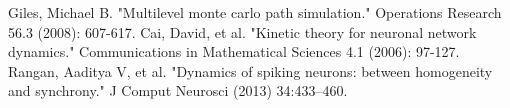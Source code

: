\documentclass[10pt]{article}
\begin{document}
\begin{multicols}{2}
\begin{thebibliography}{3}                                          
   Giles, Michael B. "Multilevel monte carlo path simulation." Operations Research 56.3 (2008): 607-617.
   Cai, David, et al. "Kinetic theory for neuronal network dynamics." Communications in Mathematical Sciences 4.1 (2006): 97-127.
   Rangan, Aaditya V, et al. "Dynamics of spiking neurons: between homogeneity and synchrony." J Comput Neurosci (2013) 34:433–460.
\end{thebibliography}

\end{multicols}
\end{document}
